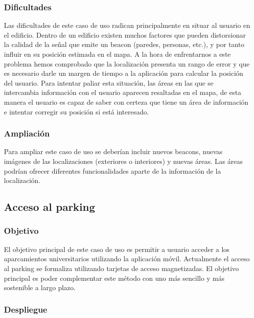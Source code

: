 \subsubsection{Dificultades}

Las dificultades de este caso de uso radican principalmente en situar al usuario en el edificio. Dentro de un edificio existen muchos factores que pueden distorsionar la calidad de la señal que emite un beacon (paredes, personas, etc.), y por tanto influir en su posición estimada en el mapa. A la hora de enfrentarnos a este problema hemos comprobado que la localización presenta un rango de error y que es necesario darle un margen de tiempo a la aplicación para calcular la posición del usuario. Para intentar paliar esta situación, las áreas en las que se intercambia información con el usuario aparecen resaltadas en el mapa, de esta manera el usuario es capaz de saber con certeza que tiene un área de información e intentar corregir su posición si está interesado. 

\subsubsection{Ampliación}

Para ampliar este caso de uso se deberían incluir nuevos beacons, nuevas imágenes de las localizaciones (exteriores o interiores) y nuevas áreas. Las áreas podrían ofrecer diferentes funcionalidades aparte de la información de la localización.


\subsection{Acceso al parking}

\subsubsection{Objetivo}

El objetivo principal de este caso de uso es permitir a usuario acceder a los aparcamientos universitarios utilizando la aplicación móvil. Actualmente el acceso al parking se formaliza utilizando tarjetas de acceso magnetizadas. El objetivo principal es poder complementar este método con uno más sencillo y más sostenible a largo plazo. 

\subsubsection{Despliegue}

